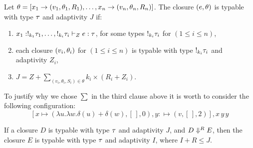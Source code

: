 \begin{defn}
  \label{def:typable}
Let $\theta=[ x_1 \to (v_1 ,  \theta_1 , R_1 ) ,
  \ldots, x_n \to (v_n, \theta_n, R_n )]$. 
  The closure $( e, \theta)$ is typable with
  type $\tau$ and adaptivity $J$ if:
\begin{enumerate}\item  
     $x_1 : !_{k_1} \tau_1, \ldots, !_{k_i} \tau_i 
     \vdash_{Z}  e : \tau$, for some types $!_{k_i}
   \tau_i$ for $(1\leq i\leq n)$, 
\item each closure $(v_i, \theta_i)$ for $(1\leq i\leq n)$ is typable with type
  $!_{k_i} \tau_i$ and adaptivity $Z_i$,
\item $J = Z + \sum_{(v_i,\theta_i,S_i)\in\theta} k_i \times (R_i
  +Z_i)$.
\end{enumerate}
 \end{defn}
To justify why we chose $\sum$ in the third clause above it is worth
to consider the following configuration:
$$
[x\mapsto (\lambda u.\lambda w.\delta(u)+\delta(w),[\,],0)
,y:\mapsto (v,[\,],2) ], x\, y\, y
$$
   
\begin{lem}[Soundness]
  \label{tsound}
  If a closure $D$ is typable with type $\tau$ and adaptivity $J$, and $D \mathrel{\Downarrow^{R}} E$, then
    the closure $E$ is typable with type $\tau$ and adaptivity $I$,
    where $I+R\leq J$. 
   \end{lem}

